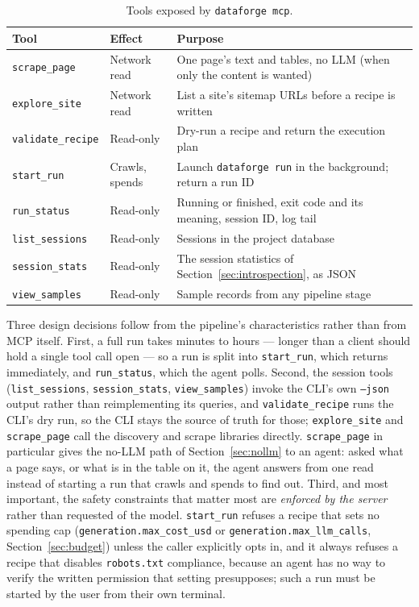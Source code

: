 \documentclass[11pt]{article}
\begin{document}
\begin{table}[h]
  \centering
  \small
  \caption{Tools exposed by \texttt{dataforge mcp}.}
  \label{tab:mcp-tools}
  \begin{tabular}{@{}l l p{7.6cm}@{}}
    \toprule
    Tool & Effect & Purpose \\
    \midrule
    \texttt{scrape\_page}     & Network read   & One page's text and tables, no LLM (when only the content is wanted) \\
    \texttt{explore\_site}    & Network read   & List a site's sitemap URLs before a recipe is written \\
    \texttt{validate\_recipe} & Read-only      & Dry-run a recipe and return the execution plan \\
    \texttt{start\_run}       & Crawls, spends & Launch \texttt{dataforge run} in the background; return a run ID \\
    \texttt{run\_status}      & Read-only      & Running or finished, exit code and its meaning, session ID, log tail \\
    \texttt{list\_sessions}   & Read-only      & Sessions in the project database \\
    \texttt{session\_stats}   & Read-only      & The session statistics of Section~\ref{sec:introspection}, as JSON \\
    \texttt{view\_samples}    & Read-only      & Sample records from any pipeline stage \\
    \bottomrule
  \end{tabular}
\end{table}

Three design decisions follow from the pipeline's characteristics rather
than from MCP itself. First, a full run takes minutes to hours --- longer
than a client should hold a single tool call open --- so a run is split
into \texttt{start\_run}, which returns immediately, and
\texttt{run\_status}, which the agent polls. Second, the session tools
(\texttt{list\_sessions}, \texttt{session\_stats}, \texttt{view\_samples})
invoke the CLI's own \texttt{--json} output rather than reimplementing
its queries, and \texttt{validate\_recipe} runs the CLI's dry run, so the
CLI stays the source of truth for those; \texttt{explore\_site} and
\texttt{scrape\_page} call the discovery and scrape libraries directly.
\texttt{scrape\_page} in particular gives the no-LLM path of
Section~\ref{sec:nollm} to an agent: asked what a page says, or what is
in the table on it, the agent answers from one read instead of starting
a run that crawls and spends to find out. Third, and most important,
the safety constraints that matter most are \emph{enforced by the server} rather
than requested of the model. \texttt{start\_run} refuses a recipe that
sets no spending cap (\texttt{generation.max\_cost\_usd} or
\texttt{generation.max\_llm\_calls}, Section~\ref{sec:budget}) unless the
caller explicitly opts in, and it always refuses a recipe that disables
\texttt{robots.txt} compliance, because an agent has no way to verify the
written permission that setting presupposes; such a run must be started
by the user from their own terminal.
\end{document}
